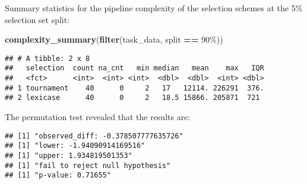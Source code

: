 \documentclass[
]{book}
\newenvironment{Shaded}{\begin{snugshade}}{\end{snugshade}}
\newcommand{\AttributeTok}[1]{\textcolor[rgb]{0.13,0.29,0.53}{#1}}
\newcommand{\DecValTok}[1]{\textcolor[rgb]{0.00,0.00,0.81}{#1}}
\newcommand{\FunctionTok}[1]{\textcolor[rgb]{0.13,0.29,0.53}{\textbf{#1}}}
\newcommand{\NormalTok}[1]{#1}
\newcommand{\OtherTok}[1]{\textcolor[rgb]{0.56,0.35,0.01}{#1}}
\newcommand{\SpecialCharTok}[1]{\textcolor[rgb]{0.81,0.36,0.00}{\textbf{#1}}}
\newcommand{\StringTok}[1]{\textcolor[rgb]{0.31,0.60,0.02}{#1}}
\begin{document}
Summary statistics for the pipeline complexity of the selection schemes at the 5\% selection set split:

\begin{Shaded}
\begin{Highlighting}[]
\FunctionTok{complexity\_summary}\NormalTok{(}\FunctionTok{filter}\NormalTok{(task\_data, split }\SpecialCharTok{==} \StringTok{\textquotesingle{}90\%\textquotesingle{}}\NormalTok{))}
\end{Highlighting}
\end{Shaded}

\begin{verbatim}
## # A tibble: 2 x 8
##   selection  count na_cnt   min median   mean    max   IQR
##   <fct>      <int>  <int> <int>  <dbl>  <dbl>  <int> <dbl>
## 1 tournament    40      0     2   17   12114. 226291  376.
## 2 lexicase      40      0     2   18.5 15866. 205871  721
\end{verbatim}

The permutation test revealed that the results are:

\begin{Shaded}
\end{Shaded}

\begin{verbatim}
## [1] "observed_diff: -0.378507777635726"
## [1] "lower: -1.94090914169516"
## [1] "upper: 1.934819501353"
## [1] "fail to reject null hypothesis"
## [1] "p-value: 0.71655"
\end{verbatim}
\end{document}
